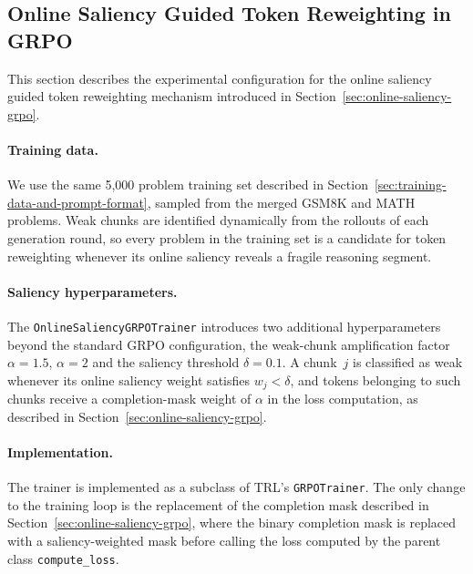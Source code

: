 \documentclass[12pt]{report}
\begin{document}

\subsection{Online Saliency Guided Token Reweighting in GRPO}
\label{sec:exp-saliency-grpo}

This section describes the experimental configuration for the online
saliency guided token reweighting mechanism introduced in
Section~\ref{sec:online-saliency-grpo}.

\paragraph{Training data.}
We use the same 5{,}000 problem training set described in
Section~\ref{sec:training-data-and-prompt-format}, sampled from the merged
GSM8K and MATH problems. Weak chunks are identified
dynamically from the rollouts of each generation round, so every problem in
the training set is a candidate for token reweighting whenever its
online saliency reveals a fragile reasoning segment.

\paragraph{Saliency hyperparameters.}
The \texttt{OnlineSaliencyGRPOTrainer} introduces two additional hyperparameters beyond the standard GRPO configuration, the weak-chunk amplification factor $\alpha = 1.5$, $\alpha = 2$ and the saliency threshold $\delta = 0.1$. 
A chunk~$j$ is classified as weak whenever its online saliency weight satisfies $w_j < \delta$, and tokens belonging to such chunks receive a completion-mask weight of $\alpha$  in the loss computation, as described in Section~\ref{sec:online-saliency-grpo}.



\paragraph{Implementation.}
The trainer is implemented as a subclass of TRL's \texttt{GRPOTrainer}. The only change to the training loop is the replacement of the completion mask described in Section~\ref{sec:online-saliency-grpo}, 
where the binary completion mask is replaced with a saliency-weighted mask before calling the loss computed by the parent class \texttt{compute\_\allowbreak loss}.
\end{document}
